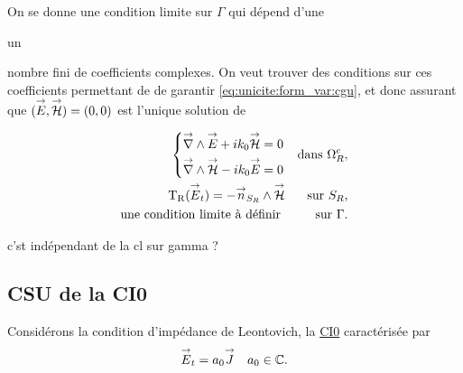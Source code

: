   On se donne une condition limite sur \(\Gamma\) qui dépend d'une
  \begin{REM}
  un
\end{REM} nombre fini de coefficients complexes.
  On veut trouver des conditions sur ces coefficients permettant de de garantir  \eqref{eq:unicite:form_var:cgu}, et donc assurant que \(({\overset{\rightarrow}{E}},{\overset{\rightarrow}{\mathcal{H}}}) = (0,0)\) est l'unique solution de



  \begin{equation}
    \label{eq:unicite:probleme_sans_ci}
    \begin{aligned}
      \left\lbrace
      \begin{aligned}
        {\overset{\rightarrow}{\nabla}}\wedge{{\overset{\rightarrow}{E}}} + ik_0{\overset{\rightarrow}{\mathcal{H}}} &= 0
        \\
        {\overset{\rightarrow}{\nabla}}\wedge{{\overset{\rightarrow}{\mathcal{H}}}} - ik_0{\overset{\rightarrow}{E}} &= 0
      \end{aligned}
      \right. && \text{dans \(\Omega^c_R\)},
      \\
      \operatorname{T_R}({\overset{\rightarrow}{E}}_t) = - {\overset{\rightarrow}{n}}_{S_R} \wedge {\overset{\rightarrow}{\mathcal{H}}} && \text{sur \(S_R\),}
      \\
      \text{une condition limite à définir }  && \text{sur \(\Gamma\).}
    \end{aligned}
  \end{equation}
\begin{REM}
  c'st indépendant de la cl sur gamma ?
\end{REM}
  \subsection{CSU de la CI0}
    Considérons la condition d’impédance de Leontovich, la \hyperlink{ci0}{CI0} caractérisée par
    \begin{align}
      \label{eq:unicite:ci0}
      {\overset{\rightarrow}{E}}_t = a_0 {\overset{\rightarrow}{J}} &&  a_0 \in \mathbb C.
    \end{align}

